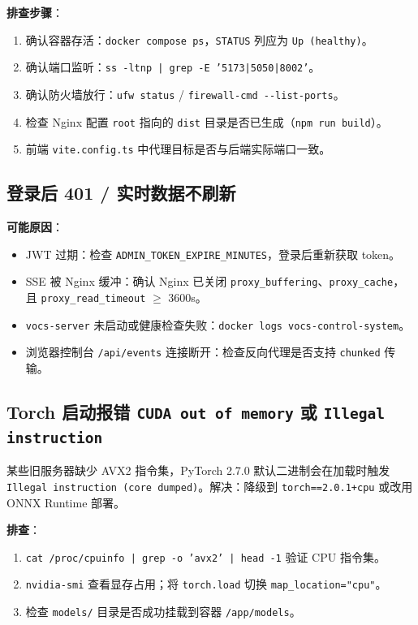 \documentclass[UTF8,a4paper,11pt]{ctexart}
\begin{document}
\textbf{排查步骤}：
\begin{enumerate}[leftmargin=1.6em,itemsep=2pt]
  \item 确认容器存活：\texttt{docker compose ps}，\texttt{STATUS} 列应为 \texttt{Up (healthy)}。
  \item 确认端口监听：\texttt{ss -ltnp | grep -E '5173|5050|8002'}。
  \item 确认防火墙放行：\texttt{ufw status} / \texttt{firewall-cmd -{}-list-ports}。
  \item 检查 Nginx 配置 \texttt{root} 指向的 \texttt{dist} 目录是否已生成（\texttt{npm run build}）。
  \item 前端 \texttt{vite.config.ts} 中代理目标是否与后端实际端口一致。
\end{enumerate}

\subsection{登录后 401 / 实时数据不刷新}

\textbf{可能原因}：
\begin{itemize}[leftmargin=1.4em,itemsep=2pt]
  \item JWT 过期：检查 \texttt{ADMIN\_TOKEN\_EXPIRE\_MINUTES}，登录后重新获取 token。
  \item SSE 被 Nginx 缓冲：确认 Nginx 已关闭 \texttt{proxy\_buffering}、\texttt{proxy\_cache}，且 \texttt{proxy\_read\_timeout} $\geq$ 3600s。
  \item \texttt{vocs-server} 未启动或健康检查失败：\texttt{docker logs vocs-control-system}。
  \item 浏览器控制台 \texttt{/api/events} 连接断开：检查反向代理是否支持 \texttt{chunked} 传输。
\end{itemize}

\subsection{Torch 启动报错 \texttt{CUDA out of memory} 或 \texttt{Illegal instruction}}

\begin{dangerbox}
某些旧服务器缺少 AVX2 指令集，PyTorch 2.7.0 默认二进制会在加载时触发
\texttt{Illegal instruction (core dumped)}。解决：降级到 \texttt{torch==2.0.1+cpu}
或改用 ONNX Runtime 部署。
\end{dangerbox}

\textbf{排查}：
\begin{enumerate}[leftmargin=1.6em,itemsep=2pt]
  \item \texttt{cat /proc/cpuinfo | grep -o 'avx2' | head -1} 验证 CPU 指令集。
  \item \texttt{nvidia-smi} 查看显存占用；将 \texttt{torch.load} 切换 \texttt{map\_location="cpu"}。
  \item 检查 \texttt{models/} 目录是否成功挂载到容器 \texttt{/app/models}。
\end{enumerate}
\end{document}
